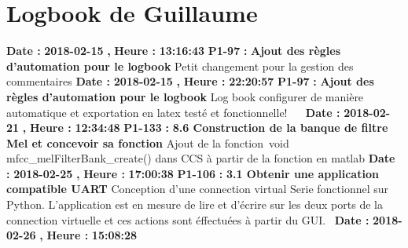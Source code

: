 \documentclass{article}%
\begin{document}
%
\section{Logbook de Guillaume}%
\textbf{Date : }%
\textbf{2018{-}02{-}15}%
\textbf{,}%
\textbf{ Heure : }%
\textbf{13:16:43}%
\newline%
%
\textbf{P1{-}97 }%
\textbf{ : }%
\textbf{ Ajout des règles d'automation pour le logbook}%
\newline%
\newline%
%
Petit changement pour la gestion des commentaires\newline%
\newline%
%
\textbf{Date : }%
\textbf{2018{-}02{-}15}%
\textbf{,}%
\textbf{ Heure : }%
\textbf{22:20:57}%
\newline%
%
\textbf{P1{-}97 }%
\textbf{ : }%
\textbf{ Ajout des règles d'automation pour le logbook}%
\newline%
\newline%
%
Log book configurer de manière automatique et exportation en latex testé et fonctionnelle!~\newline%
~\newline%
\newline%
%
\textbf{Date : }%
\textbf{2018{-}02{-}21}%
\textbf{,}%
\textbf{ Heure : }%
\textbf{12:34:48}%
\newline%
%
\textbf{P1{-}133 }%
\textbf{ : }%
\textbf{ 8.6 Construction de la banque de filtre Mel et concevoir sa fonction}%
\newline%
\newline%
%
Ajout de la fonction~void mfcc\_melFilterBank\_create() dans CCS à partir de la fonction en matlab\newline%
\newline%
%
\textbf{Date : }%
\textbf{2018{-}02{-}25}%
\textbf{,}%
\textbf{ Heure : }%
\textbf{17:00:38}%
\newline%
%
\textbf{P1{-}106 }%
\textbf{ : }%
\textbf{ 3.1 Obtenir une application compatible UART}%
\newline%
\newline%
%
Conception d'une connection virtual Serie fonctionnel sur Python.\newline%
L'application est en mesure de lire et d'écrire sur les deux ports de la connection virtuelle et ces actions sont éffectuées à partir du GUI.~\newline%
\newline%
%
\textbf{Date : }%
\textbf{2018{-}02{-}26}%
\textbf{,}%
\textbf{ Heure : }%
\textbf{15:08:28}%
\end{document}
